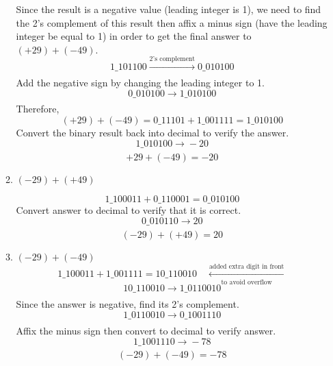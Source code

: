 \documentclass[12pt]{book}
\begin{document}
\begin{enumerate}
\begin{enumerate}
        \newpage
        Since the result is a negative value (leading integer is 1), we need to find the 2's complement of this result then affix a minus sign (have the leading integer be equal to 1) in order to get the final answer to $(+29)+(-49)$.
        $$1\_101100 \xrightarrow[]{\text{2's complement}} 0\_010100$$
        Add the negative sign by changing the leading integer to 1.
        $$0\_010100 \xrightarrow[]{} 1\_010100$$
        Therefore, $$(+29)+(-49) = 0\_11101 + 1\_001111 = 1\_010100$$
        Convert the binary result back into decimal to verify the answer.
        $$1\_010100 \xrightarrow[]{} -20$$
        $$+29 + (-49) = -20$$
        
        \item $(-29)+(+49)$
        
        $$1\_100011 + 0\_110001 = 0\_010100$$
        Convert answer to decimal to verify that it is correct.
        $$0\_010110 \xrightarrow[]{}20$$
        $$(-29)+(+49) = 20$$
        
        \item $(-29)+(-49)$\\
        
        $$1\_100011 + 1\_001111 = 10\_110010 \quad \xleftarrow[\text{to avoid overflow}]{\text{added extra digit in front}}$$
        $$10\_110010 \xrightarrow[]{} 1\_0110010$$
        Since the answer is negative, find its 2's complement.\\
        $$1\_0110010 \xrightarrow[]{} 0\_1001110$$
        Affix the minus sign then convert to decimal to verify answer.\\
        $$1\_1001110 \xrightarrow[]{} -78$$
        $$(-29)+(-49) = -78$$
        
    \end{enumerate}

    
    
    
    
\end{enumerate}
\end{document}
